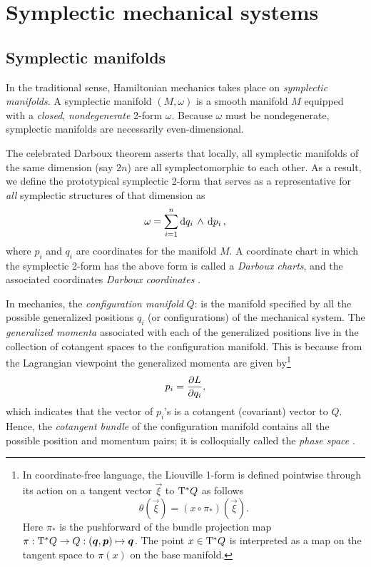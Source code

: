 \section{Symplectic mechanical systems}
\label{sec:symplectic}

\subsection{Symplectic manifolds}
In the traditional sense, Hamiltonian mechanics takes place on \emph{symplectic manifolds}. A symplectic manifold $(M, \omega)$ is a smooth manifold $M$ equipped with a \emph{closed}, \emph{nondegenerate} 2-form $\omega$. Because $\omega$ must be nondegenerate, symplectic manifolds are necessarily even-dimensional. 

The celebrated Darboux theorem asserts that locally, all symplectic manifolds of the same dimension (say $2n$) are all symplectomorphic to each other. As a result, we define the prototypical symplectic 2-form that serves as a representative for \emph{all} symplectic structures of that dimension as
\begin{equation}
    \omega = \sum_{i = 1}^n  \dd{q_i}\,\wedge\,\dd{p_i} ,
    \label{eq:darboux_symplectic_form}
\end{equation}
where $p_i$ and $q_i$ are coordinates for the manifold $M$. A coordinate chart in which the symplectic 2-form has the above form is called a \emph{Darboux charts}, and the associated coordinates \emph{Darboux coordinates} \cite{Cannas2001, Arnold1989}.

In mechanics, the \emph{configuration manifold} $Q$: is the manifold specified by all the possible generalized positions $q_i$ (or configurations) of the mechanical system. The \emph{generalized momenta} associated with each of the generalized positions live in the collection of cotangent spaces to the configuration manifold. This is because from the Lagrangian viewpoint the generalized momenta are given by\footnote
{
    In coordinate-free language, the Liouville 1-form is defined pointwise through its action on a tangent vector $\vec{\xi}$ to $\mathrm{T}^*Q$ as follows
    $$ \theta(\vec{\xi}) = (x \circ \pi_*) (\vec{\xi}). $$
    Here $\pi_*$ is the pushforward of the bundle projection map $\pi: \ctbundle{Q} \to Q: (\vec{q}, \vec{p}) \mapsto \vec{q}$. The point $x \in \mathrm{T}^*Q$ is interpreted as a map on the tangent space to $\pi(x)$ on the base manifold.
}
$$ p_i = \pdv{L}{q_i}, $$
which indicates that the vector of $p_i$'s is a cotangent (covariant) vector to $Q$. Hence, the \emph{cotangent bundle} of the configuration manifold contains all the possible position and momentum pairs; it is colloquially called the \emph{phase space} \cite{Abraham1978,Arnold1989,Libermann1987}.

